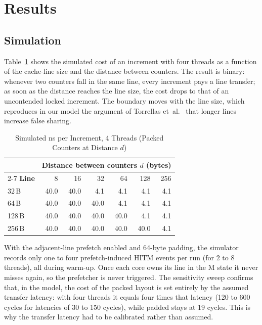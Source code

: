 \documentclass[journal]{IEEEtran}
\begin{document}
\section{Results}
\label{sec:results}

\subsection{Simulation}
Table~\ref{tab:simline} shows the simulated cost of an increment with four
threads as a function of the cache-line size and the distance between
counters. The result is binary: whenever two counters fall in the same line,
every increment pays a line transfer; as soon as the distance reaches the line
size, the cost drops to that of an uncontended locked increment. The boundary
moves with the line size, which reproduces in our model the argument of
Torrellas et~al.~\cite{torrellas1994false} that longer lines increase false
sharing.

\begin{table}[!t]
\caption{Simulated ns per Increment, 4 Threads (Packed Counters at Distance $d$)}
\label{tab:simline}
\centering
\begin{tabular}{@{}lrrrrrr@{}}
\toprule
& \multicolumn{6}{c}{\textbf{Distance between counters $d$ (bytes)}} \\
\cmidrule(l){2-7}
\textbf{Line} & 8 & 16 & 32 & 64 & 128 & 256 \\
\midrule
32\,B  & 40.0 & 40.0 & 4.1 & 4.1 & 4.1 & 4.1 \\
64\,B  & 40.0 & 40.0 & 40.0 & 4.1 & 4.1 & 4.1 \\
128\,B & 40.0 & 40.0 & 40.0 & 40.0 & 4.1 & 4.1 \\
256\,B & 40.0 & 40.0 & 40.0 & 40.0 & 40.0 & 4.1 \\
\bottomrule
\end{tabular}
\end{table}

With the adjacent-line prefetch enabled and 64-byte padding, the simulator
records only one to four prefetch-induced HITM events per run (for 2 to 8
threads), all during warm-up. Once each core owns its line in the M state it
never misses again, so the prefetcher is never triggered.
The sensitivity sweep confirms that, in the model, the cost of the packed
layout is set entirely by the assumed transfer latency: with four threads it
equals four times that latency (120 to 600 cycles for latencies of 30 to 150
cycles), while padded stays at 19 cycles. This is why the transfer latency had
to be calibrated rather than assumed.
\end{document}
